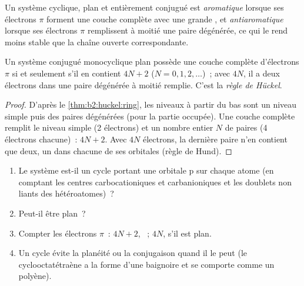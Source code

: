 \begin{definition}[Aromaticité]\label{def:b2:huckel:aromatic}
Un système cyclique, plan et entièrement conjugué est \emph{aromatique} lorsque
ses électrons $\pi$ forment une couche complète avec une grande , et
\emph{antiaromatique} lorsque ses électrons $\pi$ remplissent à moitié une paire
dégénérée, ce qui le rend moins stable que la chaîne ouverte correspondante.
\end{definition}

\begin{theorem}\label{thm:b2:huckel:huckel-rule}
Un système conjugué monocyclique plan possède une couche complète d'électrons $\pi$ si et seulement
s'il en contient $4N + 2$ ($N = 0, 1, 2, \dots$)~; avec $4N$, il a deux électrons dans une
paire dégénérée à moitié remplie. C'est la \emph{règle de Hückel}.
\end{theorem}

\begin{proof}
D'après le \cref{thm:b2:huckel:ring}, les niveaux à partir du bas sont un niveau simple puis
des paires dégénérées (pour la partie occupée). Une couche complète remplit le niveau
simple (2 électrons) et un nombre entier $N$ de paires (4 électrons chacune)~: $4N + 2$. Avec
$4N$ électrons, la dernière paire n'en contient que deux, un dans chacune de ses orbitales (règle de
Hund).
\end{proof}

\begin{method}\label{met:b2:huckel:aromaticity}
\begin{enumerate}
  \item Le système est-il un cycle portant une orbitale p sur chaque atome (en comptant les centres
        carbocationiques et carbanioniques et les doublets non liants des hétéroatomes)~?
  \item Peut-il être plan~?
  \item Compter les électrons $\pi$~: $4N + 2$, ~; $4N$,  s'il est plan.
  \item Un cycle  évite la planéité ou la conjugaison quand il le peut
        (le cyclooctatétraène a la forme d'une baignoire et se comporte comme un polyène).
\end{enumerate}
\end{method}


